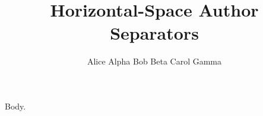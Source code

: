 \documentclass{article}
\title{Horizontal-Space Author Separators}
\author{Alice Alpha \hspace{1cm} Bob Beta \hspace{1cm} Carol Gamma}
\begin{document}
\maketitle
Body.
\end{document}
